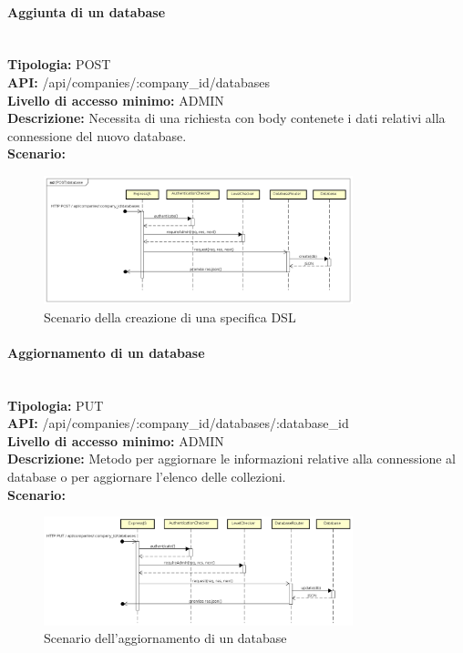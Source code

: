 \newpage
\paragraph{Aggiunta di un database}\mbox{}\\
\textbf{Tipologia:} POST \\
\textbf{API:} /api/companies/:company\_id/databases \\
\textbf{Livello di accesso minimo:} ADMIN \\
\textbf{Descrizione:} Necessita di una richiesta con body contenete i dati relativi alla connessione del nuovo database. \\
\textbf{Scenario:}
\begin{figure}[H]
\centering
\includegraphics[width=0.8\textwidth]{res/sections/backend/sequence/(POST)database.png}
\caption{Scenario della creazione di una specifica DSL}
\end{figure}

\newpage
\paragraph{Aggiornamento di un database}\mbox{}\\
\textbf{Tipologia:} PUT \\
\textbf{API:} /api/companies/:company\_id/databases/:database\_id \\
\textbf{Livello di accesso minimo:} ADMIN \\
\textbf{Descrizione:} Metodo per aggiornare le informazioni relative alla connessione al database o per aggiornare l'elenco delle collezioni. \\
\textbf{Scenario:}
\begin{figure}[H]
\centering
\includegraphics[width=0.8\textwidth]{res/sections/backend/sequence/(PUT)database.png}
\caption{Scenario dell'aggiornamento di un database}
\end{figure}

